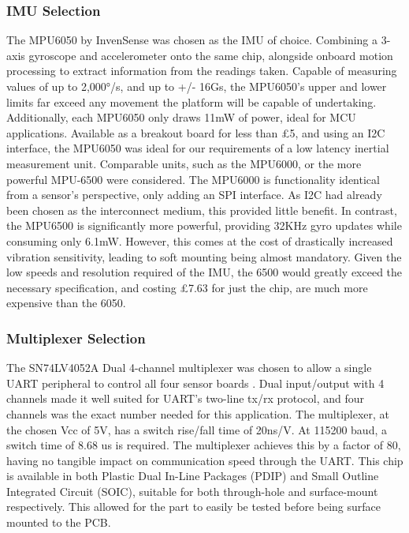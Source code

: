 \documentclass [12pt]{article}
\begin{document}
\subsubsection{IMU Selection}
The MPU6050 by InvenSense was chosen as the IMU of choice. Combining a 3-axis gyroscope and accelerometer onto the same chip, alongside onboard motion processing to extract information from the readings taken. Capable of measuring values of up to 2,000°/s, and up to +/- 16Gs, the MPU6050’s upper and lower limits far exceed any movement the platform will be capable of undertaking. Additionally, each MPU6050 only draws 11mW of power, ideal for MCU applications.
Available as a breakout board for less than £5, and using an I2C interface, the MPU6050 was ideal for our requirements of a low latency inertial measurement unit. Comparable units, such as the MPU6000, or the more powerful MPU-6500 were considered. The MPU6000 is functionality identical from a sensor’s perspective, only adding an SPI interface. As I2C had already been chosen as the interconnect medium, this provided little benefit. In contrast, the MPU6500 is significantly more powerful, providing 32KHz gyro updates while consuming only 6.1mW. However, this comes at the cost of drastically increased vibration sensitivity, leading to soft mounting being almost mandatory. Given the low speeds and resolution required of the IMU, the 6500 would greatly exceed the necessary specification, and costing £7.63 for just the chip, are much more expensive than the 6050.

\subsubsection{Multiplexer Selection}
The SN74LV4052A Dual 4-channel multiplexer was chosen to allow a single UART peripheral to control all four sensor boards \cite{SN74LV4052A}. Dual input/output with 4 channels made it well suited for UART’s two-line tx/rx protocol, and four channels was the exact number needed for this application.
The multiplexer, at the chosen Vcc of 5V, has a switch rise/fall time of 20ns/V. At 115200 baud, a switch time of 8.68 us is required. The multiplexer achieves this by a factor of 80, having no tangible impact on communication speed through the UART.
This chip is available in both Plastic Dual In-Line Packages (PDIP) and Small Outline Integrated Circuit (SOIC), suitable for both through-hole and surface-mount respectively. This allowed for the part to easily be tested before being surface mounted to the PCB.
\end{document}
